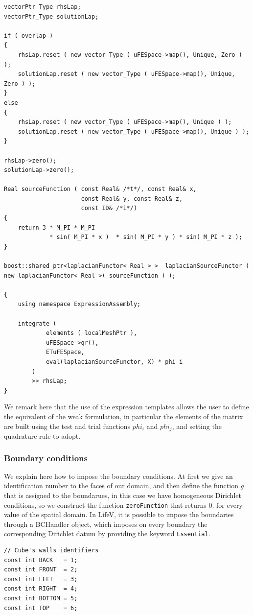 \begin{itemize}
\begin{lstlisting}
vectorPtr_Type rhsLap;
vectorPtr_Type solutionLap;

if ( overlap )
{
    rhsLap.reset ( new vector_Type ( uFESpace->map(), Unique, Zero ) );
    solutionLap.reset ( new vector_Type ( uFESpace->map(), Unique, Zero ) );
}
else
{
    rhsLap.reset ( new vector_Type ( uFESpace->map(), Unique ) );
    solutionLap.reset ( new vector_Type ( uFESpace->map(), Unique ) );
}

rhsLap->zero();
solutionLap->zero();

Real sourceFunction ( const Real& /*t*/, const Real& x, 
                      const Real& y, const Real& z, 
                      const ID& /*i*/)
{
    return 3 * M_PI * M_PI 
             * sin( M_PI * x )  * sin( M_PI * y ) * sin( M_PI * z );
}

boost::shared_ptr<laplacianFunctor< Real > >  laplacianSourceFunctor ( new laplacianFunctor< Real >( sourceFunction ) );

{
    using namespace ExpressionAssembly;
    
    integrate (
            elements ( localMeshPtr ),
            uFESpace->qr(),
            ETuFESpace,
            eval(laplacianSourceFunctor, X) * phi_i
        )
        >> rhsLap;
}
\end{lstlisting}
We remark here that the use of the expression templates allows the user to define the equivalent of the weak formulation, in particular the elements of the matrix are built using the test and trial functions $ phi_i $ and $ phi_j $, and setting the quadrature rule to adopt.

\subsubsection*{Boundary conditions}
We explain here how to impose the boundary conditions. At first we give an identification number to the faces of our domain, and then define the function $ g $ that is assigned to the boundarues, in this case we have homogeneous Dirichlet conditions, so we construct the function \verb!zeroFunction! that returns 0. for every value of the spatial domain. In LifeV, it is possible to impose the boundaries through a BCHandler object, which imposes on every boundary the corresponding Dirichlet datum by providing the keyword \verb!Essential!.
\begin{lstlisting}
// Cube's walls identifiers
const int BACK   = 1;
const int FRONT  = 2;
const int LEFT   = 3;
const int RIGHT  = 4;
const int BOTTOM = 5;
const int TOP    = 6;


\end{lstlisting}
\end{itemize}
